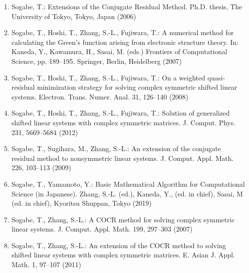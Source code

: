 \begin{enumerate}[label=\arabic*.,ref=\arabic*,leftmargin=3em]
\item\label{bib:source-165}Sogabe, T.: Extensions of the Conjugate Residual Method. Ph.D. thesis, The University of Tokyo, Tokyo, Japan (2006)

\item\label{bib:source-166}Sogabe, T., Hoshi, T., Zhang, S.-L., Fujiwara, T.: A numerical method for calculating the Green’s function arising from electronic structure theory. In: Kaneda, Y., Kawamura, H., Sasai, M. (eds.) Frontiers of Computational Science, pp. 189–195. Springer, Berlin, Heidelberg (2007)

\item\label{bib:source-167}Sogabe, T., Hoshi, T., Zhang, S.-L., Fujiwara, T.: On a weighted quasi-residual minimization strategy for solving complex symmetric shifted linear systems. Electron. Trans. Numer. Anal. 31, 126–140 (2008)

\item\label{bib:source-168}Sogabe, T., Hoshi, T., Zhang, S.-L., Fujiwara, T.: Solution of generalized shifted linear systems with complex symmetric matrices. J. Comput. Phys. 231, 5669–5684 (2012)

\item\label{bib:source-169}Sogabe, T., Sugihara, M., Zhang, S.-L.: An extension of the conjugate residual method to nonsymmetric linear systems. J. Comput. Appl. Math. 226, 103–113 (2009)

\item\label{bib:source-170}Sogabe, T., Yamamoto, Y.: Basic Mathematical Algorithm for Computational Science (in Japanese). Zhang, S.-L. (ed.), Kaneda, Y., (ed. in chief), Sasai, M (ed. in chief), Kyoritsu Shuppan, Tokyo (2019)

\item\label{bib:source-171}Sogabe, T., Zhang, S.-L.: A COCR method for solving complex symmetric linear systems. J. Comput. Appl. Math. 199, 297–303 (2007)

\item\label{bib:source-172}Sogabe, T., Zhang, S.-L.: An extension of the COCR method to solving shifted linear systems with complex symmetric matrices. E. Asian J. Appl. Math. 1, 97–107 (2011)


\end{enumerate}
